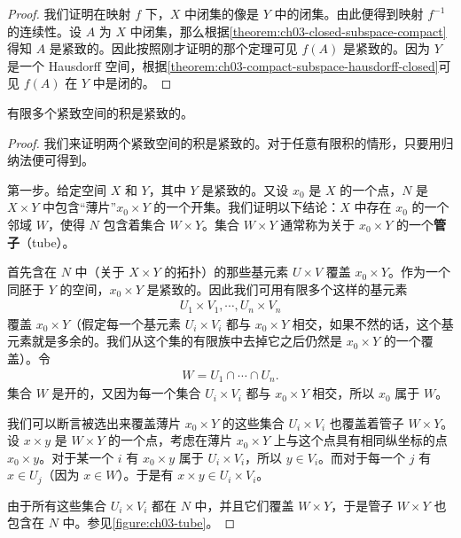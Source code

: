\begin{proof}
我们证明在映射 $f$ 下，$X$ 中闭集的像是 $Y$ 中的闭集。由此便得到映射 $f^{-1}$ 的连续性。设 $A$ 为 $X$ 中闭集，那么根据\cref{theorem:ch03-closed-subspace-compact}得知 $A$ 是紧致的。因此按照刚才证明的那个定理可见 $f(A)$ 是紧致的。因为 $Y$ 是一个 Hausdorff 空间，根据\cref{theorem:ch03-compact-subspace-hausdorff-closed}可见 $f(A)$ 在 $Y$ 中是闭的。
\end{proof}

\begin{theorem}\label{theorem:ch03-finite-product-compact}
有限多个紧致空间的积是紧致的。
\end{theorem}

\begin{proof}
我们来证明两个紧致空间的积是紧致的。对于任意有限积的情形，只要用归纳法便可得到。

第一步。给定空间 $X$ 和 $Y$，其中 $Y$ 是紧致的。又设 $x_{0}$ 是 $X$ 的一个点，$N$ 是 $X\times Y$ 中包含``薄片''$x_{0}\times Y$ 的一个开集。我们证明以下结论：$X$ 中存在 $x_{0}$ 的一个邻域 $W$，使得 $N$ 包含着集合 $W\times Y$。集合 $W\times Y$ 通常称为关于 $x_{0}\times Y$ 的一个\textbf{管子}（tube）。

首先含在 $N$ 中（关于 $X\times Y$ 的拓扑）的那些基元素 $U\times V$ 覆盖 $x_{0}\times Y$。作为一个同胚于 $Y$ 的空间，$x_{0}\times Y$ 是紧致的。因此我们可用有限多个这样的基元素
\begin{align*}
U_{1}\times V_{1},\cdots,U_{n}\times V_{n}
\end{align*}
覆盖 $x_{0}\times Y$（假定每一个基元素 $U_{i}\times V_{i}$ 都与 $x_{0}\times Y$ 相交，如果不然的话，这个基元素就是多余的。我们从这个集的有限族中去掉它之后仍然是 $x_{0}\times Y$ 的一个覆盖）。令
\begin{align*}
W=U_{1}\cap\cdots\cap U_{n}.
\end{align*}
集合 $W$ 是开的，又因为每一个集合 $U_{i}\times V_{i}$ 都与 $x_{0}\times Y$ 相交，所以 $x_{0}$ 属于 $W$。

我们可以断言被选出来覆盖薄片 $x_{0}\times Y$ 的这些集合 $U_{i}\times V_{i}$ 也覆盖着管子 $W\times Y$。设 $x\times y$ 是 $W\times Y$ 的一个点，考虑在薄片 $x_{0}\times Y$ 上与这个点具有相同纵坐标的点 $x_{0}\times y$。对于某一个 $i$ 有 $x_{0}\times y$ 属于 $U_{i}\times V_{i}$，所以 $y\in V_{i}$。而对于每一个 $j$ 有 $x\in U_{j}$（因为 $x\in W$）。于是有 $x\times y\in U_{i}\times V_{i}$。

由于所有这些集合 $U_{i}\times V_{i}$ 都在 $N$ 中，并且它们覆盖 $W\times Y$，于是管子 $W\times Y$ 也包含在 $N$ 中。参见\cref{figure:ch03-tube}。


\end{proof}
